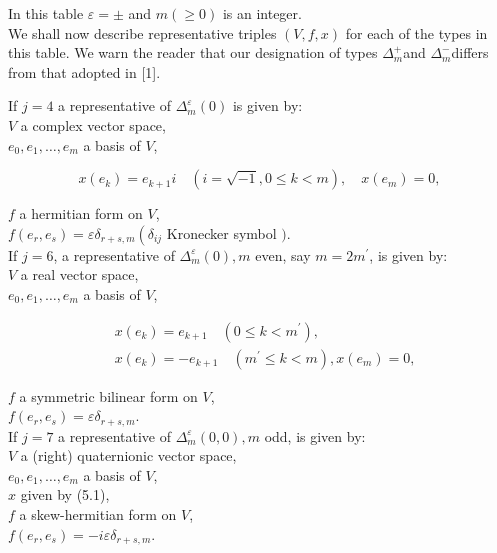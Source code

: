 \documentclass[10pt]{article}
\begin{document}
In this table $\varepsilon= \pm$ and $m(\geqslant 0)$ is an integer.\\
We shall now describe representative triples $(V, f, x)$ for each of the types in this table. We warn the reader that our designation of types $\Delta_{m}^{+}$and $\Delta_{m}^{-}$differs from that adopted in [1].

If $j=4$ a representative of $\Delta_{m}^{\varepsilon}(0)$ is given by:\\
$V$ a complex vector space,\\
$e_{0}, e_{1}, \ldots, e_{m}$ a basis of $V$,


\begin{equation*}
x\left(e_{k}\right)=e_{k+1} i \quad(i=\sqrt{-1}, 0 \leqslant k<m), \quad x\left(e_{m}\right)=0, \tag{5.1}
\end{equation*}


$f$ a hermitian form on $V$,\\
$f\left(e_{r}, e_{s}\right)=\varepsilon \delta_{r+s, m}\left(\delta_{i j}\right.$ Kronecker symbol $)$.\\
If $j=6$, a representative of $\Delta_{m}^{\varepsilon}(0), m$ even, say $m=2 m^{\prime}$, is given by:\\
$V$ a real vector space,\\
$e_{0}, e_{1}, \ldots, e_{m}$ a basis of $V$,


\begin{align*}
& x\left(e_{k}\right)=e_{k+1} \quad\left(0 \leqslant k<m^{\prime}\right), \\
& x\left(e_{k}\right)=-e_{k+1} \quad\left(m^{\prime} \leqslant k<m\right), x\left(e_{m}\right)=0, \tag{5.2}
\end{align*}


$f$ a symmetric bilinear form on $V$,\\
$f\left(e_{r}, e_{s}\right)=\varepsilon \delta_{r+s, m}$.\\
If $j=7$ a representative of $\Delta_{m}^{\varepsilon}(0,0), m$ odd, is given by:\\
$V$ a (right) quaternionic vector space,\\
$e_{0}, e_{1}, \ldots, e_{m}$ a basis of $V$,\\
$x$ given by (5.1),\\
$f$ a skew-hermitian form on $V$,\\
$f\left(e_{r}, e_{s}\right)=-i \varepsilon \delta_{r+s, m}$.
\end{document}
